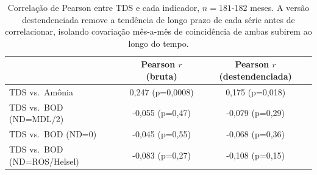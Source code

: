 \begin{table}[H]
    \centering
    \begin{tabular}{l|c|c}
         & Pearson $r$ (bruta) & Pearson $r$ (destendenciada) \\ \hline
        TDS vs.\ Amônia & 0,247 (p=0,0008) & 0,175 (p=0,018) \\
        TDS vs.\ BOD (ND=MDL/2) & -0,055 (p=0,47) & -0,079 (p=0,29) \\
        TDS vs.\ BOD (ND=0) & -0,045 (p=0,55) & -0,068 (p=0,36) \\
        TDS vs.\ BOD (ND=ROS/Helsel) & -0,083 (p=0,27) & -0,108 (p=0,15) \\
    \end{tabular}
    \caption{Correlação de Pearson entre TDS e cada indicador, $n=181$-182 meses. A versão destendenciada remove a tendência de longo prazo de cada série antes de correlacionar, isolando covariação mês-a-mês de coincidência de ambas subirem ao longo do tempo.}
    \label{tab:correlacao}
\end{table}
